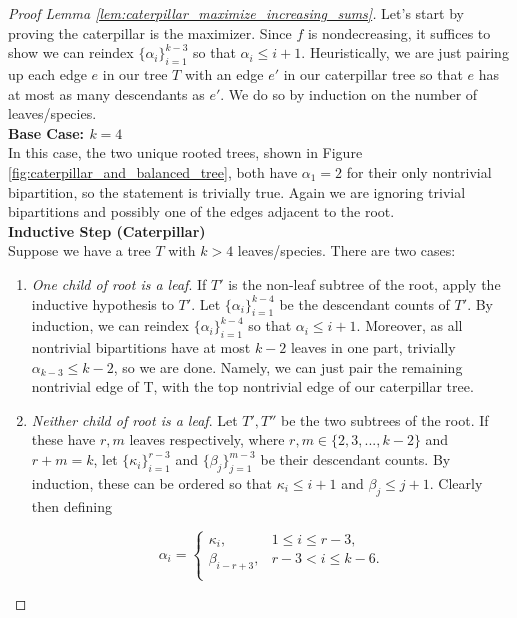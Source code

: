 \documentclass[10pt,oneside,reqno]{article}
\theoremstyle{plain}
\theoremstyle{definition}
\numberwithin{equation}{section}
\renewcommand{\leq}{\leqslant}
\begin{document}
\begin{proof}[Proof Lemma \ref{lem:caterpillar_maximize_increasing_sums}]
Let's start by proving the caterpillar is the maximizer. Since $f$ is nondecreasing, it suffices to show we can reindex $\{\alpha_i\}_{i=1}^{k-3}$ so that $\alpha_i \leq i + 1$. Heuristically, we are just pairing up each edge $e$ in our tree $T$ with an edge $e'$ in our caterpillar tree so that $e$ has at most as many descendants as $e'$. We do so by induction on the number of leaves/species. \\

\noindent \textbf{Base Case: $k = 4$}\\
\noindent In this case, the two unique rooted trees, shown in Figure \ref{fig:caterpillar_and_balanced_tree}, both have $\alpha_1 = 2$ for their only nontrivial bipartition, so the statement is trivially true. Again we are ignoring trivial bipartitions and possibly one of the edges adjacent to the root.\\




\noindent \textbf{Inductive Step (Caterpillar)}\\
\noindent Suppose we have a tree $T$ with $k > 4$ leaves/species. There are two cases:

\begin{enumerate}[label=(\alph*)]
    \item \textit{One child of root is a leaf}. If $T'$ is the non-leaf subtree of the root, apply the inductive hypothesis to $T'$. Let $\{\alpha_i\}_{i=1}^{k-4}$ be the descendant counts of $T'$. By induction, we can reindex $\{\alpha_i\}_{i=1}^{k-4}$ so that $\alpha_i \leq i+1$. Moreover, as all nontrivial bipartitions have at most $k-2$ leaves in one part, trivially $\alpha_{k-3} \leq k-2$, so we are done. Namely, we can just pair the remaining nontrivial edge of T, with the top nontrivial edge of our caterpillar tree.

    \item \textit{Neither child of root is a leaf}. Let $T', T''$ be the two subtrees of the root. If these have $r,m$ leaves respectively, where $r,m \in \{2,3,..., k-2\}$ and $r+m=k$, let $\{\kappa_i\}_{i=1}^{r-3}$ and $\{\beta_j\}_{j=1}^{m-3}$ be their descendant counts. By induction, these can be ordered so that $\kappa_i \leq i+1$ and $\beta_j \leq j+1$. Clearly then defining

    \[\alpha_i = \begin{cases}
        \kappa_i, & 1 \leq i \leq r-3, \\
        \beta_{i-r+3}, & r-3 < i  \leq k-6. \\
    \end{cases}\]


\end{enumerate}
\end{proof}
\end{document}
